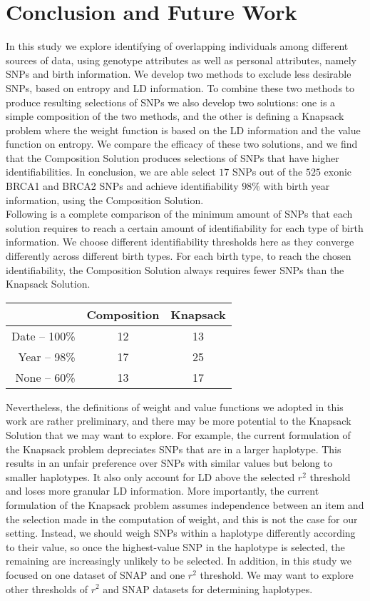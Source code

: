 \documentclass[14pt, oneside]{article}   	%
\begin{document}
\section{Conclusion and Future Work}
In this study we explore identifying of overlapping individuals among different sources of data,
using genotype attributes as well as personal attributes, namely SNPs and birth information.
We develop two methods to exclude less desirable SNPs, based on entropy and LD information.
To combine these two methods to produce resulting selections of SNPs we also develop two solutions:
one is a simple composition of the two methods,
and the other is defining a Knapsack problem where the weight function is based on the LD information and the value function on entropy.
We compare the efficacy of these two solutions, and we find that the Composition Solution produces selections of SNPs that have higher identifiabilities.
In conclusion, we are able select $17$ SNPs out of the $525$ exonic BRCA1 and BRCA2 SNPs
and achieve identifiability $98\%$ with birth year information, using the Composition Solution.
\\
Following is a complete comparison of the minimum amount of SNPs that each solution requires
to reach a certain amount of identifiability for each type of birth information.
We choose different identifiability thresholds here as they converge differently across different birth types.
For each birth type, to reach the chosen identifiability, the Composition Solution always requires fewer SNPs than the Knapsack Solution.
\begin{center}
  \begin{tabular}{ | r | c | c |}
    \hline
                           & Composition & Knapsack \\ \hline
    Date -- 100\% & 12 & 13 \\ \hline
    Year -- 98\%   & 17 & 25 \\ \hline
    None -- 60\%  & 13 & 17 \\
    \hline
  \end{tabular}
\end{center}
Nevertheless, the definitions of weight and value functions we adopted in this work are rather preliminary,
and there may be more potential to the Knapsack Solution that we may want to explore.
For example, the current formulation of the Knapsack problem depreciates SNPs that are in a larger haplotype.
This results in an unfair preference over SNPs with similar values but belong to smaller haplotypes.
It also only account for LD above the selected $r^2$ threshold and loses more granular LD information.
More importantly, the current formulation of the Knapsack problem assumes independence between an item and the selection made in the computation of weight,
and this is not the case for our setting.
Instead, we should weigh SNPs within a haplotype differently according to their value,
so once the highest-value SNP in the haplotype is selected, the remaining are increasingly unlikely to be selected.
In addition, in this study we focused on one dataset of SNAP and one $r^2$ threshold.
We may want to explore other thresholds of $r^2$ and SNAP datasets for determining haplotypes.
%
%
%
%
%
%    
%
%
%
%
%
%
% 
%
%
%
%
%
%
%
%
%
%
%
%
%
%
%
%


%
\end{document}

